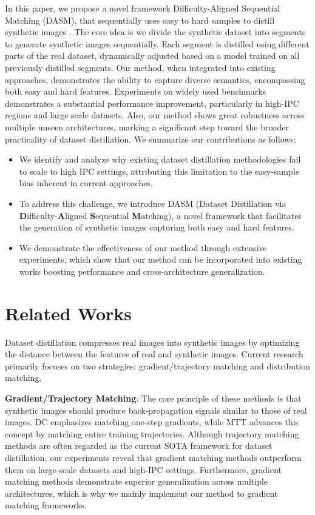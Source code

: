 \documentclass{article}
\theoremstyle{plain}
\theoremstyle{definition}
\theoremstyle{remark}
\begin{document}
In this paper, we propose a novel framework Difficulty-Aligned Sequential Matching (DASM), that sequentially uses easy to hard samples to distill synthetic images . The core idea is we divide the synthetic dataset into segments to generate synthetic images sequentially. Each segment is distilled using different parts of the real dataset, dynamically adjusted based on a model trained on all previously distilled segments. Our method, when integrated into existing approaches, demonstrates the ability to capture diverse semantics, encompassing both easy and hard features. Experiments on widely used benchmarks demonstrates a substantial performance improvement, particularly in high-IPC regions and large scale datasets. Also,
our method shows great robustness across multiple unseen architectures, marking a significant step toward the broader practicality of dataset distillation. We summarize our contributions as follows:
\begin{itemize}
    \item We identify and analyze why existing dataset distillation methodologies fail to scale to high IPC settings, attributing this limitation to the easy-sample bias inherent in current approaches.
    \item To address this challenge, we introduce DASM (Dataset Distillation via \textbf{D}ifficulty-\textbf{A}ligned \textbf{S}equential \textbf{M}atching), a novel framework that facilitates the generation of synthetic images capturing both easy and hard features.
    \item We demonstrate the effectiveness of our method through extensive experiments, which show that our method can be incorporated into existing works boosting performance and cross-architecture generalization.
\end{itemize}


\section{Related Works}
Dataset distillation compresses real images into synthetic images by optimizing the distance between the features of real and synthetic images. Current research primarily focuses on two strategies: gradient/trajectory matching and distribution matching.

\textbf{Gradient/Trajectory Matching}: The core principle of these methods is that synthetic images should produce back-propagation signals similar to those of real images. DC emphasizes matching one-step gradients, while MTT advances this concept by matching entire training trajectories. Although trajectory matching methods are often regarded as the current SOTA framework for dataset distillation, our experiments reveal that gradient matching methods outperform them on large-scale datasets and high-IPC settings. Furthermore, gradient matching methods demonstrate superior generalization across multiple architectures, which is why we mainly implement our method to gradient matching frameworks.
\end{document}
